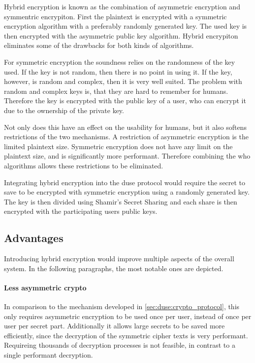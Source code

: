 Hybrid encryption is known as the combination of asymmetric encryption and
symmentric encrypiton. First the plaintext is encrypted with a symmetric
encryption algorithm with a preferably randomly generated key. The used key is
then encrypted with the asymmetric public key algorithm. Hybrid encrypiton
eliminates some of the drawbacks for both kinds of algorithms.

For symmetric encryption the soundness relies on the randomness of the key
used. If the key is not random, then there is no point in using it. If the key,
however, is random and complex, then it is very well suited. The problem with
random and complex keys is, that they are hard to remember for humans.
Therefore the key is encrypted with the public key of a user, who can encrypt
it due to the ownership of the private key.

Not only does this have an effect on the usability for humans, but it also
softens restrictions of the two mechanisms. A restriction of asymmetric
encryption is the limited plaintext size. Symmetric encryption does not have
any limit on the plaintext size, and is significantly more performant.
Therefore combining the who algorithms allows these restrictions to be
eliminated.

Integrating hybrid encryption into the duse protocol would require the secret
to save to be encrypted with symmetric encryption using a randomly generated
key. The key is then divided using Shamir's Secret Sharing and each share is
then encrypted with the participating users public keys.

\subsection{Advantages}

Introducing hybrid encryption would improve multiple aspects of the overall
system. In the following paragraphs, the most notable ones are depicted.

\paragraph{Less asymmetric crypto}{ In comparison to the mechanism developed in
  \ref{sec:duse:crypto_protocol}, this only requires asymmetric encryption to
  be used once per user, instead of once per user per secret part. Additionally
  it allows large secrets to be saved more efficiently, since the decryption of
the symmetric cipher texts is very performant. Requireing thousands of
decryption processes is not feasible, in contrast to a single performant
decryption.}

